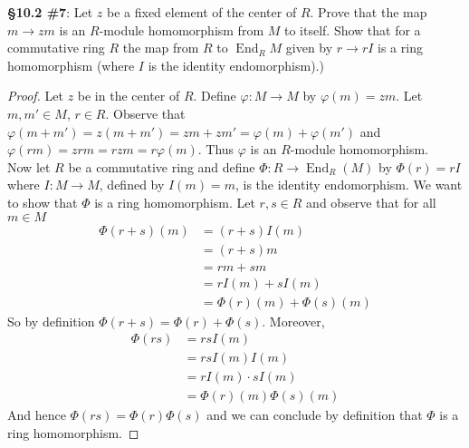 \documentclass[8pt]{amsart}
\theoremstyle{plain}%
\theoremstyle{definition}
\theoremstyle{remark}
\numberwithin{equation}{section}
\begin{document}
\textbf{\S 10.2 \#7}: Let $z$ be a fixed element of the center of $R$. Prove that the map $m \to zm$ is an $R$-module homomorphism from $M$ to itself. Show that for a commutative ring $R$ the map from $R$ to $\operatorname{End}_R{M}$ given by $r \to rI$ is a ring homomorphism (where $I$ is the identity endomorphism).)
	\begin{proof}
		 Let $z$ be in the center of $R$. Define $\varphi : M \to M$ by $\varphi(m) = zm$. Let $m, m' \in M$, $r \in R$. Observe that $\varphi(m + m') = z(m + m') = zm + zm' = \varphi(m) + \varphi(m')$ and $\varphi(rm) = zrm = rzm = r\varphi(m)$. Thus $\varphi$ is an $R$-module homomorphism.\\

		Now let $R$ be a commutative ring and define $\Phi : R \to \operatorname{End}_R(M)$ by $\Phi(r) = rI$ where $I : M \to M$, defined by $I(m) = m$, is the identity endomorphism. We want to show that $\Phi$ is a ring homomorphism. Let $r, s \in R$ and observe that for all $m \in M$
		\begin{align*}
			\Phi(r + s)(m) &= (r + s)I(m)\\
			&= (r + s)m\\
			&= rm + sm\\
			&= rI(m) + sI(m)\\
			&= \Phi(r)(m) + \Phi(s)(m)
		\end{align*}
		So by definition $\Phi(r + s) = \Phi(r) + \Phi(s)$. Moreover,
		\begin{align*}
			\Phi(rs) &= rsI(m)\\
			&= rsI(m)I(m)\\
			&= rI(m) \cdot sI(m)\\
			&= \Phi(r)(m) \Phi(s)(m)
		\end{align*}
		And hence $\Phi(rs) = \Phi(r)\Phi(s)$ and we can conclude by definition that $\Phi$ is a ring homomorphism.
	\end{proof}
\end{document}
